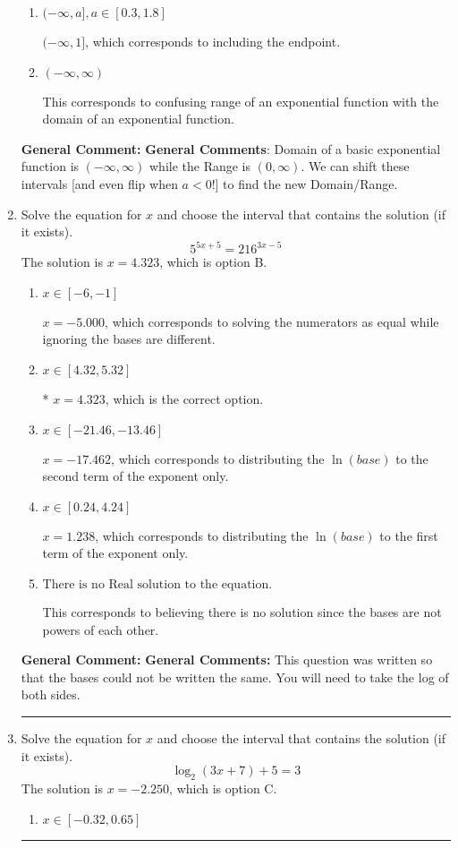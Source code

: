 \documentclass{extbook}[14pt]
\newcommand{\litem}[1]{\item #1

\rule{\textwidth}{0.4pt}}
\begin{document}
\begin{enumerate}
{\begin{enumerate}[label=\Alph*.]
* $(-\infty, 1)$, which is the correct option.
\item \( (-\infty, a], a \in [0.3, 1.8] \)

$(-\infty, 1]$, which corresponds to including the endpoint.
\item \( (-\infty, \infty) \)

This corresponds to confusing range of an exponential function with the domain of an exponential function.
\end{enumerate}

\textbf{General Comment:} \textbf{General Comments}: Domain of a basic exponential function is $(-\infty, \infty)$ while the Range is $(0, \infty)$. We can shift these intervals [and even flip when $a<0$!] to find the new Domain/Range.
}
\litem{
Solve the equation for $x$ and choose the interval that contains the solution (if it exists).
\[ 5^{5x+5} = 216^{3x-5} \]
The solution is \( x = 4.323 \), which is option B.\begin{enumerate}[label=\Alph*.]
\item \( x \in [-6, -1] \)

$x = -5.000$, which corresponds to solving the numerators as equal while ignoring the bases are different.
\item \( x \in [4.32, 5.32] \)

* $x = 4.323$, which is the correct option.
\item \( x \in [-21.46, -13.46] \)

$x = -17.462$, which corresponds to distributing the $\ln(base)$ to the second term of the exponent only.
\item \( x \in [0.24, 4.24] \)

$x = 1.238$, which corresponds to distributing the $\ln(base)$ to the first term of the exponent only.
\item \( \text{There is no Real solution to the equation.} \)

This corresponds to believing there is no solution since the bases are not powers of each other.
\end{enumerate}

\textbf{General Comment:} \textbf{General Comments:} This question was written so that the bases could not be written the same. You will need to take the log of both sides.
}
\litem{
Solve the equation for $x$ and choose the interval that contains the solution (if it exists).
\[ \log_{2}{(3x+7)}+5 = 3 \]
The solution is \( x = -2.250 \), which is option C.\begin{enumerate}[label=\Alph*.]
\item \( x \in [-0.32, 0.65] \)


\end{enumerate}}
\end{enumerate}
\end{document}
